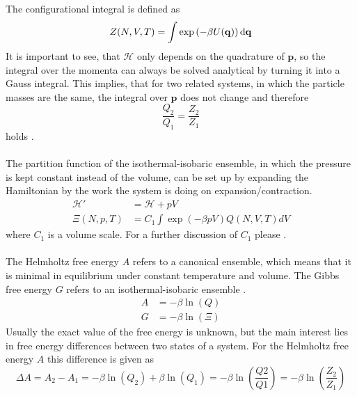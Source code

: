 The configurational integral is defined as 
\begin{equation}
Z(N, V, T) = \int \exp\left(-{\beta U}(\mathbf{q})\right) \text{d} \mathbf{q}
\end{equation}
It is important to see, that $\mathcal{H}$ only depends on the quadrature of $\mathbf{p}$, so the integral over the momenta can always be solved analytical by turning it into a Gauss integral. This implies, that for two related systems, in which the particle masses are the same, the integral over $\mathbf{p}$ does not change and therefore
\begin{equation}
\frac{Q_2}{Q_1} = \frac{Z_2}{Z_1}
\end{equation}
holds \autocite[17]{freeEnergyBook}.\\
\\
The partition function of the isothermal-isobaric ensemble, in which the pressure is kept constant instead of the volume, can be set up by expanding the Hamiltonian by the work the system is doing on expansion/contraction.
\begin{align}
\mathcal{H}' &= \mathcal{H} + pV\\
\Xi(N, p, T) &= C_1 \int \exp\left(-\beta p V\right) Q(N, V, T) dV
\end{align}
where $C_1$ is a volume scale. For a further discussion of $C_1$ please \autocite[see][]{isothermalIsobaric}.\\
\\
The Helmholtz free energy $A$ refers to a canonical ensemble, which means that it is minimal in equilibrium under constant temperature and volume. The Gibbs free energy $G$ refers to an isothermal-isobaric ensemble \autocite[19]{freeEnergyBook}.
\begin{align}
A &= - \beta \ln\left(Q\right)\\
G &= - \beta \ln\left(\Xi\right)
\end{align}
Usually the exact value of the free energy is unknown, but the main interest lies in free energy differences between two states of a system. For the Helmholtz free energy $A$ this difference is given as
\begin{equation}
\Delta A = A_2 - A_1 = - \beta \ln\left(Q_2\right) + \beta \ln\left(Q_1\right) = -\beta \ln\left(\frac{Q2}{Q1}\right) = -\beta \ln \left(\frac{Z_2}{Z_1}\right)
\end{equation}
